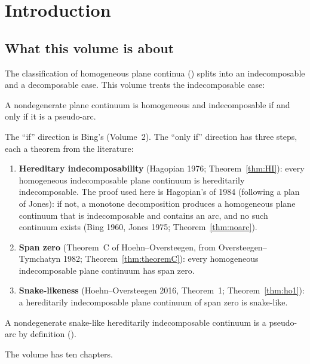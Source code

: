 \chapter{Introduction}\label{ch:intro}

\section{What this volume is about}

The classification of homogeneous plane continua () splits into an indecomposable and a decomposable case. This
volume treats the indecomposable case:

\begin{theorem}
A nondegenerate plane continuum is homogeneous and indecomposable if and only if it is a pseudo-arc.
\end{theorem}

The ``if'' direction is Bing's (Volume~2). The ``only if'' direction has three steps, each a theorem from the literature:
\begin{enumerate}
\item \textbf{Hereditary indecomposability} (Hagopian 1976; Theorem~\ref{thm:HI}): every homogeneous indecomposable plane continuum is hereditarily
indecomposable. The proof used here is Hagopian's of 1984 (following a plan of Jones): if not, a monotone decomposition produces a homogeneous plane
continuum that is indecomposable and contains an arc, and no such continuum exists (Bing 1960, Jones 1975; Theorem~\ref{thm:noarc}).
\item \textbf{Span zero} (Theorem~C of Hoehn--Oversteegen, from Oversteegen--Tymchatyn 1982; Theorem~\ref{thm:theoremC}): every homogeneous indecomposable plane
continuum has span zero.
\item \textbf{Snake-likeness} (Hoehn--Oversteegen 2016, Theorem~1; Theorem~\ref{thm:ho1}): a hereditarily indecomposable plane continuum of span zero is snake-like.
\end{enumerate}
A nondegenerate snake-like hereditarily indecomposable continuum is a pseudo-arc by definition ().

The volume has ten chapters.

